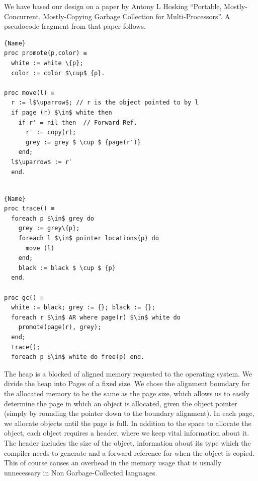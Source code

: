 \documentclass{article}
\begin{document}
We have based our design on a paper by Antony L Hosking ``Portable, Mostly-Concurrent, Mostly-Copying Garbage Collection for Multi-Processors''. A pseudocode fragment from that paper follows. 

\noindent\begin{minipage}{.46\textwidth}
\begin{lstlisting}[frame=tlrb, mathescape]{Name}
proc promote(p,color) ≡ 
  white := white \{p}; 
  color := color $\cup$ {p}.

proc move(l) ≡ 
  r := l$\uparrow$; // r is the object pointed to by l
  if page (r) $\in$ white then 
    if r' = nil then  // Forward Ref. 
      r' := copy(r);
      grey := grey $ \cup $ {page(r′)}
    end;
  l$\uparrow$ := r′
  end.


\end{lstlisting}
\end{minipage}\hfill
\begin{minipage}{.45\textwidth}
\begin{lstlisting}[frame=tlrb, mathescape]{Name}
proc trace() ≡ 
  foreach p $\in$ grey do
    grey := grey\{p};
    foreach l $\in$ pointer locations(p) do
      move (l)
    end;
    black := black $ \cup $ {p}
  end.

proc gc() ≡
  white := black; grey := {}; black := {}; 
  foreach r $\in$ AR where page(r) $\in$ white do
    promote(page(r), grey);
  end;
  trace();
  foreach p $\in$ white do free(p) end.
\end{lstlisting}
\end{minipage}

The heap is a blocked of aligned memory requested to the operating system. We divide the heap into Pages of a fixed
size. We chose the alignment boundary for the allocated memory to be the same as the page size, which allows us
to easily determine the page in which an object is allocated, given the object pointer (simply by rounding the pointer
down to the boundary alignment). In each page, we allocate objects until the page is full. In addition to the space 
to allocate the object, each object requires a header, where we keep vital information about it. The header includes the size of the object, information about its type which the compiler needs to generate and a forward reference for when the object is copied. This of course causes an overhead in the memory usage that is usually unnecessary in Non Garbage-Collected languages. 
\end{document}
